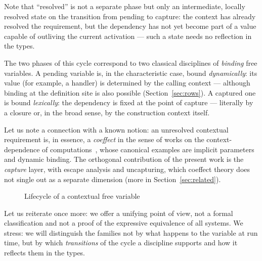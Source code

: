 \documentclass[11pt]{article}
\begin{document}
Note that \enquote{resolved} is not a separate phase but only an intermediate, locally
resolved state on the transition from pending to capture: the context has already resolved the requirement, but the dependency has not yet
become part of a value capable of outliving the current activation --- such a state needs
no reflection in the types.

The two phases of this cycle correspond to two classical disciplines of \emph{binding} free
variables. A pending variable is, in the characteristic case, bound \emph{dynamically}:
its value (for example, a handler) is determined by the calling context --- although
binding at the definition site is also possible (Section~\ref{sec:rows}). A captured one is bound
\emph{lexically}: the dependency is fixed at the point of capture --- literally by a closure
or, in the broad sense, by the construction context itself.

Let us note a connection with a known notion: an unresolved contextual requirement is, in essence,
a \emph{coeffect} in the sense of works on the context-dependence of computations~\cite{petricek2014coeffects},
whose canonical examples are implicit parameters and dynamic binding.
The orthogonal contribution of the present work is the \emph{capture} layer, with escape analysis and
uncapturing, which coeffect theory does not single out as a separate dimension
(more in Section~\ref{sec:related}).

\begin{figure}[t]
\centering
{}
\caption{Lifecycle of a contextual free variable}
\label{fig:lifecycle}
\end{figure}

Let us reiterate once more: we offer a unifying point of view, not a formal
classification and not a proof of the expressive equivalence of all systems.
We stress: we will distinguish the families not by what happens to the variable at
run time, but by which \emph{transitions} of the cycle a discipline supports and how
it reflects them in the types.
\end{document}
